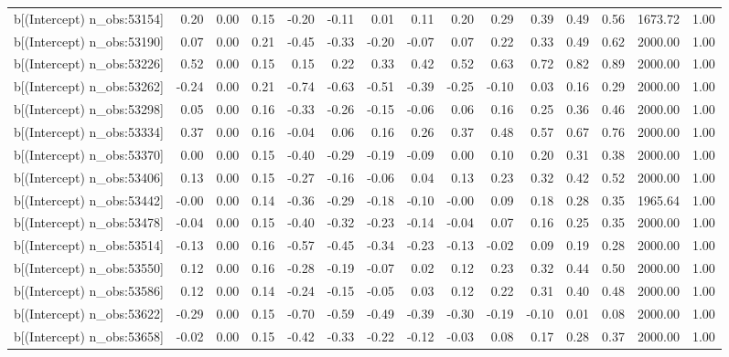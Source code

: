 \begin{table}[ht]
\begin{tabular}{rrrrrrrrrrrrrrr}
  b[(Intercept) n\_obs:53154] & 0.20 & 0.00 & 0.15 & -0.20 & -0.11 & 0.01 & 0.11 & 0.20 & 0.29 & 0.39 & 0.49 & 0.56 & 1673.72 & 1.00 \\ 
  b[(Intercept) n\_obs:53190] & 0.07 & 0.00 & 0.21 & -0.45 & -0.33 & -0.20 & -0.07 & 0.07 & 0.22 & 0.33 & 0.49 & 0.62 & 2000.00 & 1.00 \\ 
  b[(Intercept) n\_obs:53226] & 0.52 & 0.00 & 0.15 & 0.15 & 0.22 & 0.33 & 0.42 & 0.52 & 0.63 & 0.72 & 0.82 & 0.89 & 2000.00 & 1.00 \\ 
  b[(Intercept) n\_obs:53262] & -0.24 & 0.00 & 0.21 & -0.74 & -0.63 & -0.51 & -0.39 & -0.25 & -0.10 & 0.03 & 0.16 & 0.29 & 2000.00 & 1.00 \\ 
  b[(Intercept) n\_obs:53298] & 0.05 & 0.00 & 0.16 & -0.33 & -0.26 & -0.15 & -0.06 & 0.06 & 0.16 & 0.25 & 0.36 & 0.46 & 2000.00 & 1.00 \\ 
  b[(Intercept) n\_obs:53334] & 0.37 & 0.00 & 0.16 & -0.04 & 0.06 & 0.16 & 0.26 & 0.37 & 0.48 & 0.57 & 0.67 & 0.76 & 2000.00 & 1.00 \\ 
  b[(Intercept) n\_obs:53370] & 0.00 & 0.00 & 0.15 & -0.40 & -0.29 & -0.19 & -0.09 & 0.00 & 0.10 & 0.20 & 0.31 & 0.38 & 2000.00 & 1.00 \\ 
  b[(Intercept) n\_obs:53406] & 0.13 & 0.00 & 0.15 & -0.27 & -0.16 & -0.06 & 0.04 & 0.13 & 0.23 & 0.32 & 0.42 & 0.52 & 2000.00 & 1.00 \\ 
  b[(Intercept) n\_obs:53442] & -0.00 & 0.00 & 0.14 & -0.36 & -0.29 & -0.18 & -0.10 & -0.00 & 0.09 & 0.18 & 0.28 & 0.35 & 1965.64 & 1.00 \\ 
  b[(Intercept) n\_obs:53478] & -0.04 & 0.00 & 0.15 & -0.40 & -0.32 & -0.23 & -0.14 & -0.04 & 0.07 & 0.16 & 0.25 & 0.35 & 2000.00 & 1.00 \\ 
  b[(Intercept) n\_obs:53514] & -0.13 & 0.00 & 0.16 & -0.57 & -0.45 & -0.34 & -0.23 & -0.13 & -0.02 & 0.09 & 0.19 & 0.28 & 2000.00 & 1.00 \\ 
  b[(Intercept) n\_obs:53550] & 0.12 & 0.00 & 0.16 & -0.28 & -0.19 & -0.07 & 0.02 & 0.12 & 0.23 & 0.32 & 0.44 & 0.50 & 2000.00 & 1.00 \\ 
  b[(Intercept) n\_obs:53586] & 0.12 & 0.00 & 0.14 & -0.24 & -0.15 & -0.05 & 0.03 & 0.12 & 0.22 & 0.31 & 0.40 & 0.48 & 2000.00 & 1.00 \\ 
  b[(Intercept) n\_obs:53622] & -0.29 & 0.00 & 0.15 & -0.70 & -0.59 & -0.49 & -0.39 & -0.30 & -0.19 & -0.10 & 0.01 & 0.08 & 2000.00 & 1.00 \\ 
  b[(Intercept) n\_obs:53658] & -0.02 & 0.00 & 0.15 & -0.42 & -0.33 & -0.22 & -0.12 & -0.03 & 0.08 & 0.17 & 0.28 & 0.37 & 2000.00 & 1.00 \\ 

\end{tabular}
\end{table}
